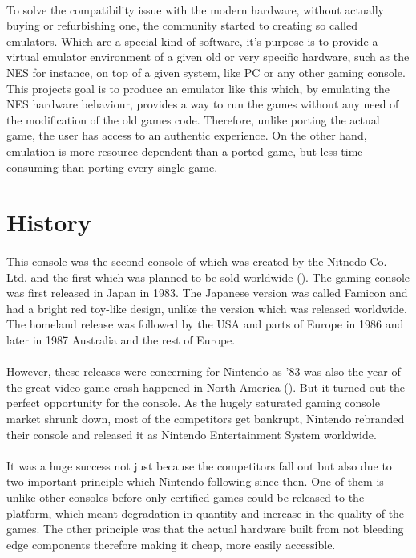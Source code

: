 \documentclass[]{report}
\begin{document}
\paragraph{ }
To solve the compatibility issue with the modern hardware, without actually buying or refurbishing one, the community started to creating so called emulators. Which are a special kind of software, it's purpose is to provide a virtual emulator environment of a given old or very specific hardware, such as the NES for instance, on top of a given system, like PC or any other gaming console. This projects goal is to produce an emulator like this which, by emulating the NES hardware behaviour, provides a way to run the games without any need of the modification of the old games code. Therefore, unlike porting the actual game, the user has access to an authentic experience. On the other hand, emulation is more resource dependent than a ported game, but less time consuming than porting every single game.

\section{History}

\paragraph{ }
 This console was the second console of which was created by the Nitnedo Co. Ltd. and the first which was planned to be sold worldwide (\cite{HIST}).
The gaming console was first released in Japan in 1983. The Japanese version was called Famicon and had a bright red toy-like design, unlike the version which was released worldwide.
The homeland release was followed by the USA and parts of Europe in 1986 and later in 1987 Australia and the rest of Europe.
\paragraph{ }
However, these releases were concerning for Nintendo as '83 was also the year of the great video game crash happened in North America (\cite{CRSH}). But it turned out the perfect opportunity for the console. As the hugely saturated gaming console market shrunk down, most of the competitors get bankrupt, Nintendo rebranded their console and released it as Nintendo Entertainment System worldwide.
\paragraph{ }
 It was a huge success not just because the competitors fall out but also due to two important principle which Nintendo following since then. One of them is unlike other consoles before only certified games could be released to the platform, which meant degradation in quantity and increase in the quality of the games. The other principle was that the actual hardware built from not bleeding edge components therefore making it cheap, more easily accessible.
 
\end{document}
